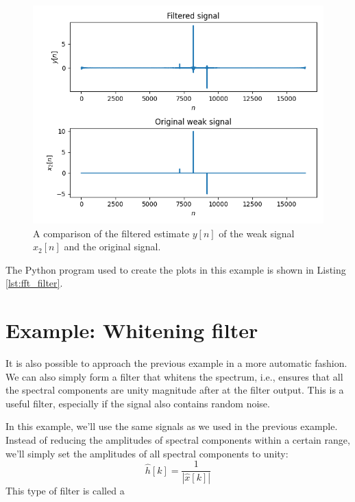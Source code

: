 \begin{figure}
\begin{center}
\includegraphics[width=\textwidth]{code/024_fft_filter/filter_filtered.png}
\end{center}
\caption{A comparison of the filtered estimate $y[n]$ of the weak signal $x_2[n]$ and the original signal.}\label{fig:filtered_weak_signal}
\end{figure}

The Python program used to create the plots in this example is shown
in Listing \ref{lst:fft_filter}.




\section{Example: Whitening filter}

It is also possible to approach the previous example in a more
automatic fashion. We can also simply form a filter that whitens the
spectrum, i.e., ensures that all the spectral components are unity
magnitude after at the filter output. This is a useful filter,
especially if the signal also contains random noise. 

In this example, we'll use the same signals as we used in the previous
example. Instead of reducing the amplitudes of spectral components
within a certain range, we'll simply set the amplitudes of all
spectral components to unity:
\begin{equation}
\hat{h}[k] = \frac{1}{|\hat{x}[k]|}
\end{equation}
This type of filter is called a 

